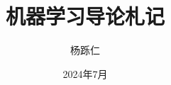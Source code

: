 \documentclass[UTF8,12pt]{ctexart}
\begin{document}
	
	\title{\Huge 机器学习导论札记} %
	\author{杨跞仁}
	\date{2024年7月} %
	\maketitle
		\newpage %
	
	\tableofcontents %
	
	\newpage %
	
	\pagestyle{fancy}
	\fancyhead{}
	\fancyfoot[R]{}
	\fancyfoot[L]{}
	
	
	\newpage %
	
	\newpage %
	
	\newpage %
	
	\newpage %
	
	\newpage %
	
	\newpage %
	
	\newpage %
	
	\newpage %

	
	
\end{document}
